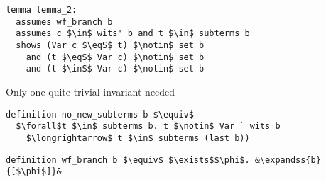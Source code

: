 \documentclass[sigplan,10pt,anonymous,review]{acmart}
\newcommand{\lefttriangle}{\mathrel{\tikz[baseline]{\draw (1ex, 0.75ex) -- (0, 1.25ex) -- (0, 0.25ex) -- cycle;}}}
\newcommand{\expandss}[2]{#1 $\lefttriangle^*$ #2}
\newcommand{\inS}{\in_\text{s}}
\newcommand{\eqS}{=_\text{s}}
\begin{document}
\begin{lstlisting}
lemma lemma_2:
  assumes wf_branch b
  assumes c $\in$ wits' b and t $\in$ subterms b
  shows (Var c $\eqS$ t) $\notin$ set b
    and (t $\eqS$ Var c) $\notin$ set b
    and (t $\inS$ Var c) $\notin$ set b
\end{lstlisting}
Only one quite trivial invariant needed 


\begin{lstlisting}
definition no_new_subterms b $\equiv$
  $\forall$t $\in$ subterms b. t $\notin$ Var ` wits b
    $\longrightarrow$ t $\in$ subterms (last b))
\end{lstlisting}

\begin{lstlisting}
definition wf_branch b $\equiv$ $\exists$$\phi$. &\expandss{b}{[$\phi$]}&
\end{lstlisting}
\end{document}
